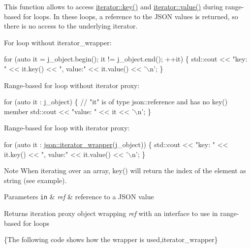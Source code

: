 This function allows to access \hyperlink{classnlohmann_1_1detail_1_1iter__impl_a3a541a223320f6635f2f188ba54f8818}{iterator\+::key()} and \hyperlink{classnlohmann_1_1detail_1_1iter__impl_ab447c50354c6611fa2ae0100ac17845c}{iterator\+::value()} during range-\/based for loops. In these loops, a reference to the J\+S\+ON values is returned, so there is no access to the underlying iterator.

For loop without iterator\+\_\+wrapper\+:


\begin{DoxyCode}
\textcolor{keywordflow}{for} (\textcolor{keyword}{auto} it = j\_object.begin(); it != j\_object.end(); ++it)
\{
    std::cout << \textcolor{stringliteral}{"key: "} << it.key() << \textcolor{stringliteral}{", value:"} << it.value() << \textcolor{charliteral}{'\(\backslash\)n'};
\}
\end{DoxyCode}


Range-\/based for loop without iterator proxy\+:


\begin{DoxyCode}
\textcolor{keywordflow}{for} (\textcolor{keyword}{auto} it : j\_object)
\{
    \textcolor{comment}{// "it" is of type json::reference and has no key() member}
    std::cout << \textcolor{stringliteral}{"value: "} << it << \textcolor{charliteral}{'\(\backslash\)n'};
\}
\end{DoxyCode}


Range-\/based for loop with iterator proxy\+:


\begin{DoxyCode}
\textcolor{keywordflow}{for} (\textcolor{keyword}{auto} it : \hyperlink{classnlohmann_1_1basic__json_a5e4212986136ca1220f351c60e89906b}{json::iterator\_wrapper}(j\_object))
\{
    std::cout << \textcolor{stringliteral}{"key: "} << it.key() << \textcolor{stringliteral}{", value:"} << it.value() << \textcolor{charliteral}{'\(\backslash\)n'};
\}
\end{DoxyCode}


\begin{DoxyNote}{Note}
When iterating over an array, {\ttfamily key()} will return the index of the element as string (see example).
\end{DoxyNote}

\begin{DoxyParams}[1]{Parameters}
\mbox{\tt in}  & {\em ref} & reference to a J\+S\+ON value \\
\hline
\end{DoxyParams}
\begin{DoxyReturn}{Returns}
iteration proxy object wrapping {\itshape ref} with an interface to use in range-\/based for loops
\end{DoxyReturn}
\{The following code shows how the wrapper is used,iterator\+\_\+wrapper\}

